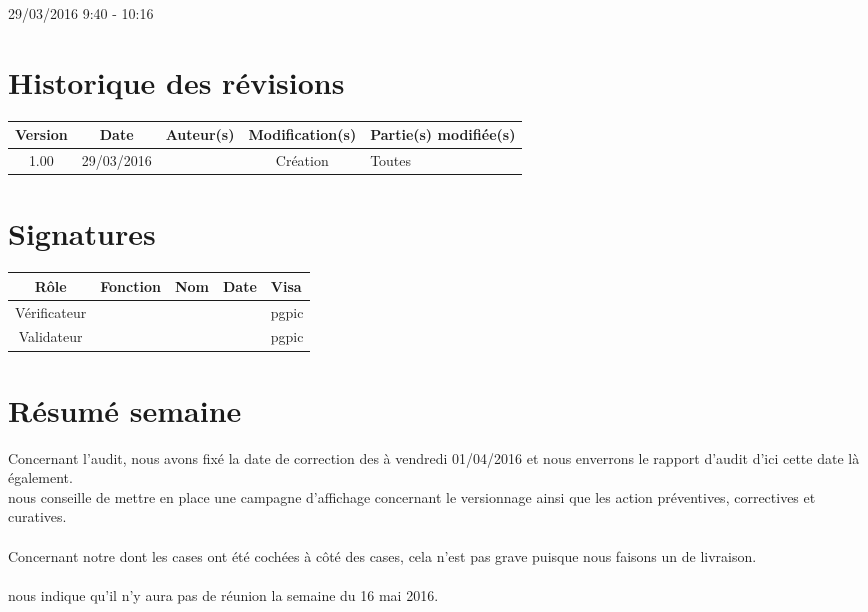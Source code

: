 \documentclass [a4paper] {article}
\begin{document}
\rhead{}

29/03/2016
\hfill   
\hfill 	9:40 - 10:16 				%



\section*{Historique des révisions}
\begin{center}
			\begin{tabular}{| c | c | c | c | p{4cm} |}
				\hline
				\rowcolor{Gray}
				Version & Date & Auteur(s) & Modification(s) & Partie(s) modifiée(s)		 \\
				\hline
				1.00 & 29/03/2016 & \Pierre & Création & Toutes \\
		\hline		
			\end{tabular}
		\end{center}

\section*{Signatures}

		\begin{center}
			\begin{tabular}{| c | c | c | c | p{4cm} |}
				\hline
				\rowcolor{Gray}
				Rôle & Fonction & Nom & Date & Visa		 \\
				\hline
				Vérificateur & \RQA & \Kafui &  & pgpic \\[30pt]
				\hline
				Validateur & \CP & \Sergi &  & pgpic \\[30pt]	
				\hline
			\end{tabular}
		\end{center}


\section{Résumé semaine}

Concernant l'audit, nous avons fixé la date de correction des \FT{} à vendredi 01/04/2016 et nous enverrons le rapport d'audit d'ici cette date là également. \\
\nomTuteurQualite{} nous conseille de mettre en place une campagne d'affichage concernant le versionnage ainsi que les action préventives, correctives et curatives. \\ ~ \\

Concernant notre \CDR{} dont les cases ont été cochées à côté des cases, cela n'est pas grave puisque nous faisons un \PV{} de livraison. \\ ~ \\

\nomTuteurQualite{} nous indique qu'il n'y aura pas de réunion la semaine du 16 mai 2016.
\end{document}
